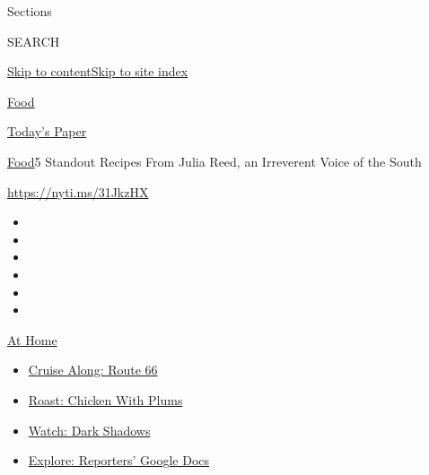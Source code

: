 Sections

SEARCH

\protect\hyperlink{site-content}{Skip to
content}\protect\hyperlink{site-index}{Skip to site index}

\href{https://www.nytimes3xbfgragh.onion/section/food}{Food}

\href{https://myaccount.nytimes3xbfgragh.onion/auth/login?response_type=cookie\&client_id=vi}{}

\href{https://www.nytimes3xbfgragh.onion/section/todayspaper}{Today's
Paper}

\href{/section/food}{Food}\textbar{}5 Standout Recipes From Julia Reed,
an Irreverent Voice of the South

\url{https://nyti.ms/31JkzHX}

\begin{itemize}
\item
\item
\item
\item
\item
\item
\end{itemize}

\href{https://www.nytimes3xbfgragh.onion/spotlight/at-home?action=click\&pgtype=Article\&state=default\&region=TOP_BANNER\&context=at_home_menu}{At
Home}

\begin{itemize}
\tightlist
\item
  \href{https://www.nytimes3xbfgragh.onion/2020/09/07/travel/route-66.html?action=click\&pgtype=Article\&state=default\&region=TOP_BANNER\&context=at_home_menu}{Cruise
  Along: Route 66}
\item
  \href{https://www.nytimes3xbfgragh.onion/2020/09/04/dining/sheet-pan-chicken.html?action=click\&pgtype=Article\&state=default\&region=TOP_BANNER\&context=at_home_menu}{Roast:
  Chicken With Plums}
\item
  \href{https://www.nytimes3xbfgragh.onion/2020/09/04/arts/television/dark-shadows-stream.html?action=click\&pgtype=Article\&state=default\&region=TOP_BANNER\&context=at_home_menu}{Watch:
  Dark Shadows}
\item
  \href{https://www.nytimes3xbfgragh.onion/interactive/2020/at-home/even-more-reporters-editors-diaries-lists-recommendations.html?action=click\&pgtype=Article\&state=default\&region=TOP_BANNER\&context=at_home_menu}{Explore:
  Reporters' Google Docs}
\end{itemize}

